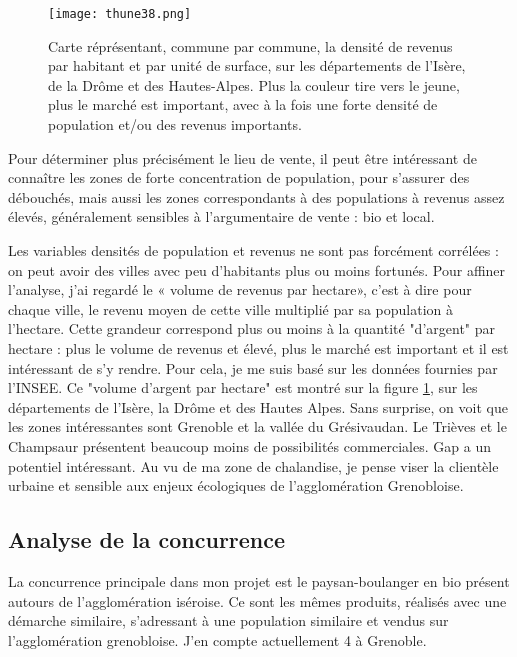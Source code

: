 \documentclass{book}
\begin{document}
\begin{figure}[h!]
\begin{center}
	\texttt{[image: thune38.png]}
	\caption{Carte réprésentant, commune par commune, la densité de revenus par habitant et par unité de surface, sur les départements de l'Isère, de la Drôme et des Hautes-Alpes. Plus la couleur tire vers le jeune, plus le marché est important, avec à la fois une forte densité de population et/ou des revenus importants.}
	\label{fig:thune38}
\end{center}
\end{figure}

Pour déterminer plus précisément le lieu de vente, il peut être intéressant de connaître les zones de forte concentration de population, pour s’assurer des débouchés, mais aussi les zones correspondants à des populations à revenus assez élevés, généralement sensibles à l’argumentaire de vente : bio et local. 

Les variables densités de population et revenus ne sont pas forcément corrélées : on peut avoir des villes avec peu d’habitants plus ou moins fortunés. Pour affiner l'analyse, j’ai regardé le « volume de revenus par hectare», c’est à dire pour chaque ville, le revenu moyen de cette ville multiplié par sa population à l’hectare. Cette grandeur correspond plus ou moins à la quantité "d'argent" par hectare : plus le volume de revenus et élevé, plus le marché est important et il est intéressant de s'y rendre. Pour cela, je me suis basé sur les données fournies par l’INSEE. Ce "volume d’argent par hectare" est montré sur la figure \ref{fig:thune38}, sur les départements de l’Isère, la Drôme et des Hautes Alpes. Sans surprise, on voit que les zones intéressantes sont Grenoble et la vallée du Grésivaudan. Le Trièves et le Champsaur présentent beaucoup moins de possibilités commerciales. Gap a un potentiel intéressant. Au vu de ma zone de chalandise, je pense viser la clientèle urbaine et sensible aux enjeux écologiques de l’agglomération Grenobloise.

\subsection{Analyse de la concurrence}

La concurrence principale dans mon projet est le paysan-boulanger en bio présent autours de l’agglomération iséroise. Ce sont les mêmes produits, réalisés avec une démarche similaire, s’adressant à une population similaire et vendus sur l’agglomération grenobloise. J’en compte actuellement 4 à Grenoble.
\end{document}
